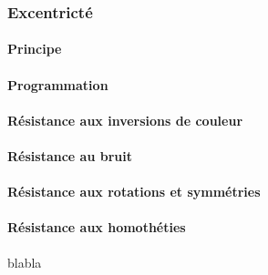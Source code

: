 \documentclass{article}
\theoremstyle{definition}
\begin{document}
      \subsubsection{Excentricté}
      
	\paragraph{Principe}
      
	\paragraph{Programmation}
	
	\paragraph{Résistance aux inversions de couleur}
	
	\paragraph{Résistance au bruit}
	
	\paragraph{Résistance aux rotations et symmétries}
      
	\paragraph{Résistance aux homothéties} blabla
	
\end{document}
